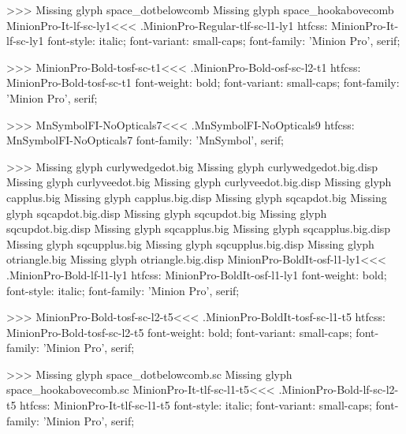 {>>>
Missing glyph	space_dotbelowcomb
Missing glyph	space_hookabovecomb
\<MinionPro-It-lf-sc-ly1\><<<
.MinionPro-Regular-tlf-sc-l1-ly1
htfcss:  MinionPro-It-lf-sc-ly1  font-style: italic; font-variant: small-caps; font-family: 'Minion Pro', serif;

>>>
\<MinionPro-Bold-tosf-sc-t1\><<<
.MinionPro-Bold-osf-sc-l2-t1
htfcss:  MinionPro-Bold-tosf-sc-t1  font-weight: bold; font-variant: small-caps; font-family: 'Minion Pro', serif;

>>>
\<MnSymbolFI-NoOpticals7\><<<
.MnSymbolFI-NoOpticals9
htfcss:  MnSymbolFI-NoOpticals7  font-family: 'MnSymbol', serif;

>>>
Missing glyph	curlywedgedot.big
Missing glyph	curlywedgedot.big.disp
Missing glyph	curlyveedot.big
Missing glyph	curlyveedot.big.disp
Missing glyph	capplus.big
Missing glyph	capplus.big.disp
Missing glyph	sqcapdot.big
Missing glyph	sqcapdot.big.disp
Missing glyph	sqcupdot.big
Missing glyph	sqcupdot.big.disp
Missing glyph	sqcapplus.big
Missing glyph	sqcapplus.big.disp
Missing glyph	sqcupplus.big
Missing glyph	sqcupplus.big.disp
Missing glyph	otriangle.big
Missing glyph	otriangle.big.disp
\<MinionPro-BoldIt-osf-l1-ly1\><<<
.MinionPro-Bold-lf-l1-ly1
htfcss:  MinionPro-BoldIt-osf-l1-ly1  font-weight: bold; font-style: italic; font-family: 'Minion Pro', serif;

>>>
\<MinionPro-Bold-tosf-sc-l2-t5\><<<
.MinionPro-BoldIt-tosf-sc-l1-t5
htfcss:  MinionPro-Bold-tosf-sc-l2-t5  font-weight: bold; font-variant: small-caps; font-family: 'Minion Pro', serif;

>>>
Missing glyph	space_dotbelowcomb.sc
Missing glyph	space_hookabovecomb.sc
\<MinionPro-It-tlf-sc-l1-t5\><<<
.MinionPro-Bold-lf-sc-l2-t5
htfcss:  MinionPro-It-tlf-sc-l1-t5  font-style: italic; font-variant: small-caps; font-family: 'Minion Pro', serif;

}
